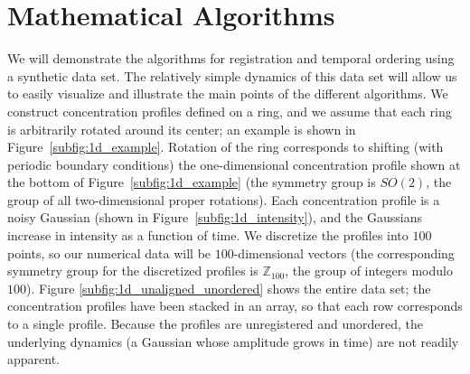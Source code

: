 \documentclass[12pt]{article}
\begin{document}
\section{Mathematical Algorithms}

We will demonstrate the algorithms for registration and temporal ordering using a synthetic data set.
%
The relatively simple dynamics of this data set will allow us to easily visualize and illustrate the main points of the different algorithms.
%
We construct concentration profiles defined on a ring, and we assume that each ring is arbitrarily rotated around its center; an example is shown in Figure~\ref{subfig:1d_example}.
%
Rotation of the ring corresponds to shifting (with periodic boundary conditions) the one-dimensional concentration profile shown at the bottom of Figure~\ref{subfig:1d_example} (the symmetry group is $SO(2)$, the group of all two-dimensional proper rotations).
%
Each concentration profile is a noisy Gaussian (shown in Figure~\ref{subfig:1d_intensity}), and the Gaussians increase in intensity as  a function of time.
%
We discretize the profiles into $100$ points, so our numerical data will be $100$-dimensional vectors (the corresponding symmetry group for the discretized profiles is $\mathbb{Z}_{100}$, the group of integers modulo $100$).
%
Figure \ref{subfig:1d_unaligned_unordered} shows the entire data set; the concentration profiles have been stacked in an array, so that each row corresponds to a single profile.
%
Because the profiles are unregistered and unordered, the underlying dynamics (a Gaussian whose amplitude grows in time) are not readily apparent.
\end{document}

